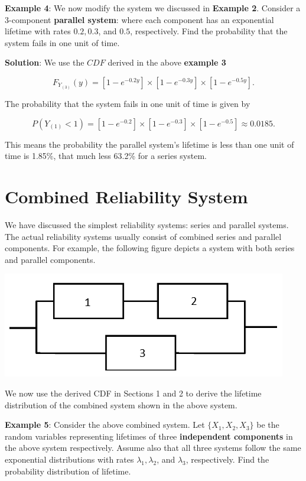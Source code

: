 \documentclass[
]{book}
\begin{document}
\textbf{\color{red}Example 4}: We now modify the system we discussed in \textbf{Example 2}. Consider a 3-component \textbf{parallel system}: where each component has an exponential lifetime with rates \(0.2, 0.3\), and \(0.5\), respectively. Find the probability that the system fails in one unit of time.

\textbf{Solution}: We use the \(CDF\) derived in the above \textbf{example 3}

\[
F_{Y_{(3)}}(y) = [1-e^{-0.2y}]\times [1-e^{-0.3y}]\times [1-e^{-0.5y}].
\]

The probability that the system fails in one unit of time is given by

\[
P(Y_{(1)} < 1) = [1-e^{-0.2}]\times [1-e^{-0.3}]\times [1-e^{-0.5}] \approx 0.0185.
\]

This means the probability the parallel system's lifetime is less than one unit of time is 1.85\%, that much less 63.2\% for a series system.

\hypertarget{combined-reliability-system}{%
\section{Combined Reliability System}\label{combined-reliability-system}}

We have discussed the simplest reliability systems: series and parallel systems. The actual reliability systems usually consist of combined series and parallel components. For example, the following figure depicts a system with both series and parallel components.

\begin{center}\includegraphics[width=0.35\linewidth]{topic12/combinedSystem} \end{center}

We now use the derived CDF in Sections 1 and 2 to derive the lifetime distribution of the combined system shown in the above system.

\textbf{\color{red}Example 5}: Consider the above combined system. Let \(\{X_1, X_2, X_3 \}\) be the random variables representing lifetimes of three \textbf{independent components} in the above system respectively. Assume also that all three systems follow the same exponential distributions with rates \(\lambda_1, \lambda_2\), and \(\lambda_3\), respectively. Find the probability distribution of lifetime.
\end{document}
